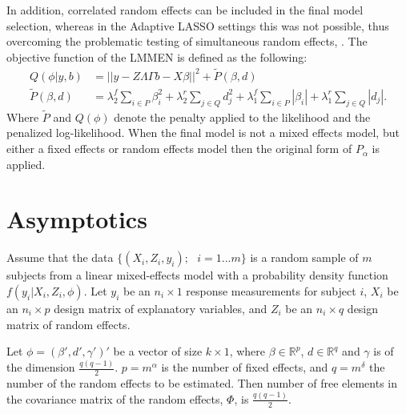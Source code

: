 \documentclass{article}
\begin{document}
In addition, correlated random effects can be included in the final model selection, whereas in the Adaptive LASSO settings this was not possible, thus overcoming the problematic testing of simultaneous random effects, \cite{ChenDunson2003}. The objective function of the LMMEN is defined as the following:
%
\begin{equation}
\label{eq:MLE-EN}
  \begin{split}
    Q(\phi|y,b)&=||y-Z\Lambda\Gamma b-X\beta||^2+\tilde{P}(\beta,d)\\
    \tilde{P}(\beta,d)&=\lambda_2^f\sum\limits_{i\in P}\beta_i^2+\lambda_2^r\sum\limits_{j\in Q}d_j^2+\lambda_1^f\sum\limits_{i \in P}|\beta_i|+\lambda_1^r\sum\limits_{j \in Q}|d_j|.
  \end{split}
\end{equation}
%
Where $\tilde{P}$ and $Q(\phi)$ denote the penalty applied to the likelihood and the penalized log-likelihood. When the final model is not a mixed effects model, but either a fixed effects or random effects model then the original form of $P_\alpha$ is applied.
		

\section{Asymptotics}
Assume that the data $\{(X_i,Z_i,y_i); \text{ } i=1...m\}$ is a random sample of $m$ subjects from a linear mixed-effects model with a probability density function $f(y_i|X_i,Z_i,\phi)$. Let $y_i$ be an $n_i \times 1$ response measurements for subject $i$, $X_i$ be an $n_i \times p$ design matrix of explanatory variables, and $Z_i$ be an $n_i \times q$ design matrix of random effects.

Let $\phi=(\beta',d',\gamma')'$ be a vector of size $k \times 1$, where $\beta \in \mathbb{R}^p$, $d \in \mathbb{R}^q$ and $\gamma$ is of the dimension $\frac{q(q-1)}{2}$. $p=m^{\alpha}$ is the number of fixed effects, and $q=m^{\delta}$ the number of the random effects to be estimated. Then number of free elements in the covariance matrix of the random effects, $\Phi$, is $\frac{q(q-1)}{2}$.
\end{document}
